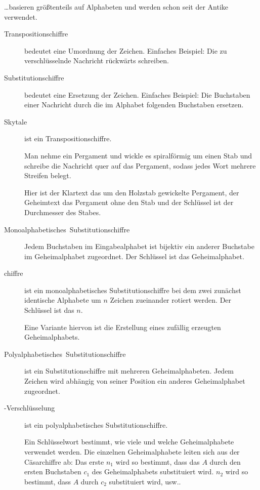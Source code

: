 \ldots{}basieren größtenteils auf Alphabeten und werden schon seit
der Antike verwendet.
\begin{description}
  \item [{Transpositionschiffre}] 
	bedeutet eine Umordnung der Zeichen.
	Einfaches Beispiel: Die zu verschlüsselnde Nachricht rückwärts schreiben.
  \item [{Substitutionschiffre}] 
	bedeutet eine Ersetzung der Zeichen.
	Einfaches Beispiel: Die Buchstaben einer Nachricht durch die im Alphabet folgenden Buchstaben ersetzen.
  \item [{Skytale}] 
	ist ein Transpositionschiffre.

	Man nehme ein Pergament und wickle es spiralförmig um einen Stab und schreibe die Nachricht quer auf das Pergament, sodass jedes Wort mehrere Streifen belegt.

	Hier ist der Klartext das um den Holzstab gewickelte Pergament, der Geheimtext das Pergament ohne den Stab und der Schlüssel ist der Durchmesser des Stabes.

  \item [{Monoalphabetisches~Substitutionschiffre}] 
	Jedem Buchstaben im Eingabe\-al\-pha\-bet ist bijektiv ein anderer Buchstabe im Geheimalphabet zugeordnet.
	Der Schlüssel ist das Geheimalphabet.

  \item [{chiffre}] 
	ist ein monoalphabetisches Substitutionschiffre bei dem zwei zunächst identische Alphabete um $n$ Zeichen zueinander rotiert werden.
	Der Schlüssel ist das $n$.

	Eine Variante hiervon ist die Erstellung eines zufällig erzeugten Geheimalphabets.

  \item [{Polyalphabetisches~Substitutionschiffre}] 
	ist ein Substitutionschiffre mit mehreren Geheimalphabeten.
	Jedem Zeichen wird abhängig von seiner Position ein anderes Geheimalphabet zugeordnet.

  \item [{-Verschlüsselung}] 
	ist ein polyalphabetisches Substitutionschiffre.

	Ein Schlüsselwort bestimmt, wie viele und welche Geheimalphabete verwendet werden.
	Die einzelnen Geheimalphabete leiten sich aus der Cäsarchiffre ab: Das erste $n_1$ wird so bestimmt, dass das $A$ durch den ersten Buchstaben $c_1$ des Geheimalphabets substituiert wird.
	$n_2$ wird so bestimmt, dass $A$ durch $c_2$ substituiert wird, usw..
\end{description}

